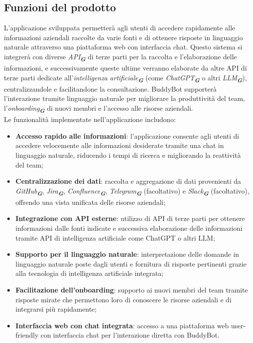 \subsection{Funzioni del prodotto}
L'applicazione sviluppata permetterà agli utenti di accedere rapidamente alle informazioni aziendali raccolte da varie 
fonti e di ottenere risposte in linguaggio naturale attraverso una piattaforma web con interfaccia chat. Questo sistema 
si integrerà con diverse \emph{API}\textsubscript{\textit{\textbf{G}}}  di terze parti per la raccolta e l'elaborazione delle informazioni, e successivamente queste ultime verranno elaborate
da altre API di terze parti dedicate all'\emph{intelligenza artificiale}\textsubscript{\textit{\textbf{G}}}  (come \emph{ChatGPT}\textsubscript{\textit{\textbf{G}}} o altri \emph{LLM}\textsubscript{\textit{\textbf{G}}}), centralizzandole e facilitandone la consultazione. 
BuddyBot supporterà l'interazione tramite linguaggio naturale per migliorare la produttività del team, l'\emph{onboarding}\textsubscript{\textit{\textbf{G}}} di nuovi 
membri e l'accesso alle risorse aziendali.\\
Le funzionalità implementate nell'applicazione includono:
\begin{itemize}
    \item \textbf{Accesso rapido alle informazioni}: l'applicazione consente agli utenti di accedere velocemente alle informazioni desiderate tramite una chat in linguaggio naturale, riducendo i tempi di ricerca e migliorando la reattività del team;
    \item \textbf{Centralizzazione dei dati}: raccolta e aggregazione di dati provenienti da \emph{GitHub}\textsubscript{\textit{\textbf{G}}}, \emph{Jira}\textsubscript{\textit{\textbf{G}}}, \emph{Confluence}\textsubscript{\textit{\textbf{G}}}, \emph{Telegram}\textsubscript{\textit{\textbf{G}}} (facoltativo) e \emph{Slack}\textsubscript{\textit{\textbf{G}}} (facoltativo), offrendo una vista unificata delle risorse aziendali;
    \item \textbf{Integrazione con API esterne}: utilizzo di API di terze parti per ottenere informazioni dalle fonti indicate e successiva elaborazione delle informazioni tramite API di intelligenza artificiale come ChatGPT o altri LLM;
    \item \textbf{Supporto per il linguaggio naturale}: interpretazione delle domande in linguaggio naturale poste dagli utenti e fornitura di risposte pertinenti grazie alla tecnologia di intelligenza artificiale integrata;
    \item \textbf{Facilitazione dell'onboarding}: supporto ai nuovi membri del team tramite risposte mirate che permettono loro di conoscere le risorse aziendali e di integrarsi più rapidamente;
    \item \textbf{Interfaccia web con chat integrata}: accesso a una piattaforma web user-friendly con interfaccia chat per l'interazione diretta con BuddyBot.
\end{itemize}

